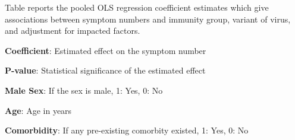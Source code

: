 \documentclass[11pt]{article}
\begin{document}
\begin{table}[h]
\caption{\protect\hyperlink{file-table-1-pkl}{Model estimates of the factors influencing symptom numbers}}
\label{table:model_estimates}
\begin{threeparttable}
\renewcommand{\TPTminimum}{\linewidth}
\begin{tablenotes}
\footnotesize
\item Table reports the pooled OLS regression coefficient estimates which give associations between symptom numbers and immunity group, variant of virus, and adjustment for impacted factors.
\item \textbf{Coefficient}: Estimated effect on the symptom number
\item \textbf{P-value}: Statistical significance of the estimated effect
\item \textbf{Male Sex}: If the sex is male, 1: Yes, 0: No
\item \textbf{Age}: Age in years
\item \textbf{Comorbidity}: If any pre-existing comorbity existed, 1: Yes, 0: No

\end{tablenotes}
\end{threeparttable}
\end{table}
\end{document}
